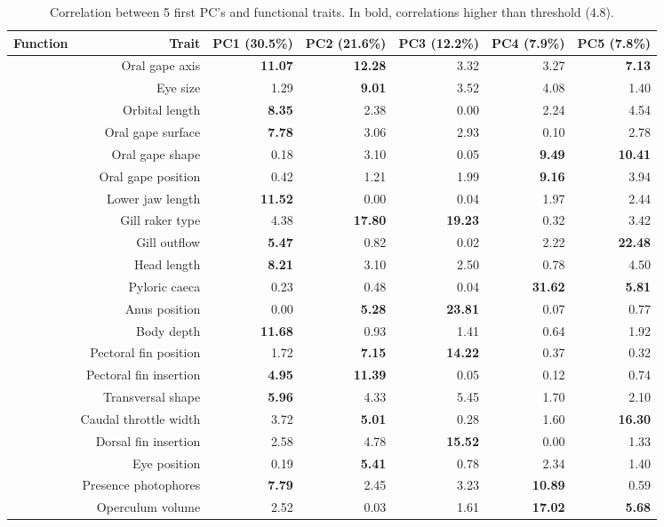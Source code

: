 \begin{table}[!htbp]
\centering
\caption[Correlations values of fifth first principal component and functional traits]{Correlation between 5 first PC's and functional traits. In bold, correlations higher than threshold (4.8).}
\label{table:cont_abs}
\begin{adjustbox}{max width=1.1\textwidth,center}
\begin{tabular}{>{\bfseries}crrrrrr}
  \hline
 Function & Trait & PC1 (30.5\%) & PC2 (21.6\%) & PC3 (12.2\%) & PC4 (7.9\%) & PC5 (7.8\%) \\ 
  \hline
  \multirow{13}{*}{Feeding} &Oral gape axis & \textbf{11.07} & \textbf{12.28} & 3.32 & 3.27 & \textbf{7.13} \\ 
  &Eye size & 1.29 & \textbf{9.01} & 3.52 & 4.08 & 1.40 \\ 
  &Orbital length & \textbf{8.35} & 2.38 & 0.00 & 2.24 & 4.54 \\ 
  &Oral gape surface & \textbf{7.78} & 3.06 & 2.93 & 0.10 & 2.78 \\ 
  &Oral gape shape & 0.18 & 3.10 & 0.05 & \textbf{9.49} & \textbf{10.41} \\ 
  &Oral gape position & 0.42 & 1.21 & 1.99 & \textbf{9.16} & 3.94 \\ 
  &Lower jaw length & \textbf{11.52} & 0.00 & 0.04 & 1.97 & 2.44 \\ 
  &Gill raker type & 4.38 & \textbf{17.80} & \textbf{19.23} & 0.32 & 3.42 \\ 
  &Gill outflow & \textbf{5.47} & 0.82 & 0.02 & 2.22 & \textbf{22.48} \\ 
  &Head length & \textbf{8.21} & 3.10 & 2.50 & 0.78 & 4.50 \\ 
  &Pyloric caeca & 0.23 & 0.48 & 0.04 & \textbf{31.62} & \textbf{5.81} \\ 
  &Anus position & 0.00 & \textbf{5.28} & \textbf{23.81} & 0.07 & 0.77 \\ 
   \hline
   \multirow{6}{*}{Locomotion} & Body depth & \textbf{11.68} & 0.93 & 1.41 & 0.64 & 1.92 \\ 
  &Pectoral fin position & 1.72 & \textbf{7.15} & \textbf{14.22} & 0.37 & 0.32 \\ 
  &Pectoral fin insertion & \textbf{4.95} & \textbf{11.39} & 0.05 & 0.12 & 0.74 \\ 
  &Transversal shape & \textbf{5.96} & 4.33 & 5.45 & 1.70 & 2.10 \\ 
  &Caudal throttle width & 3.72 & \textbf{5.01} & 0.28 & 1.60 & \textbf{16.30} \\ 
  &Dorsal fin insertion & 2.58 & 4.78 & \textbf{15.52} & 0.00 & 1.33 \\ 
  \hline
  \multirow{2}{*}{Habitat} &Eye position & 0.19 & \textbf{5.41} & 0.78 & 2.34 & 1.40 \\ 
  &Presence photophores & \textbf{7.79} & 2.45 & 3.23 & \textbf{10.89} & 0.59 \\
  &Operculum volume & 2.52 & 0.03 & 1.61 & \textbf{17.02} & \textbf{5.68} \\ 
   \hline
\end{tabular}
\end{adjustbox}
\end{table}

